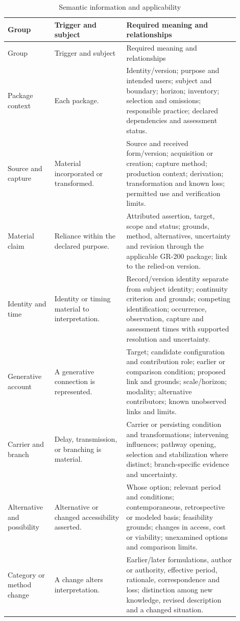 \documentclass[11pt,a4paper]{article}
\begin{document}
\begin{longtable}{@{}L{0.18\linewidth}L{0.28\linewidth}L{0.44\linewidth}@{}}
\caption{Semantic information and applicability}\label{tab:r110-semantic}\\
\toprule
Group & Trigger and subject & Required meaning and relationships\\
\midrule\endfirsthead
\toprule
Group & Trigger and subject & Required meaning and relationships\\
\midrule\endhead
Package context & Each package. & Identity/version; purpose and intended users; subject and boundary; horizon; inventory; selection and omissions; responsible practice; declared dependencies and assessment status.\\
Source and capture & Material incorporated or transformed. & Source and received form/version; acquisition or creation; capture method; production context; derivation; transformation and known loss; permitted use and verification limits.\\
Material claim & Reliance within the declared purpose. & Attributed assertion, target, scope and status; grounds, method, alternatives, uncertainty and revision through the applicable GR-200 package; link to the relied-on version.\\
Identity and time & Identity or timing material to interpretation. & Record/version identity separate from subject identity; continuity criterion and grounds; competing identification; occurrence, observation, capture and assessment times with supported resolution and uncertainty.\\
Generative account & A generative connection is represented. & Target; candidate configuration and contribution role; earlier or comparison condition; proposed link and grounds; scale/horizon; modality; alternative contributors; known unobserved links and limits.\\
Carrier and branch & Delay, transmission, or branching is material. & Carrier or persisting condition and transformations; intervening influences; pathway opening, selection and stabilization where distinct; branch-specific evidence and uncertainty.\\
Alternative and possibility & Alternative or changed accessibility asserted. & Whose option; relevant period and conditions; contemporaneous, retrospective or modeled basis; feasibility grounds; changes in access, cost or viability; unexamined options and comparison limits.\\
Category or method change & A change alters interpretation. & Earlier/later formulations, author or authority, effective period, rationale, correspondence and loss; distinction among new knowledge, revised description and a changed situation.\\

\end{longtable}
\end{document}
